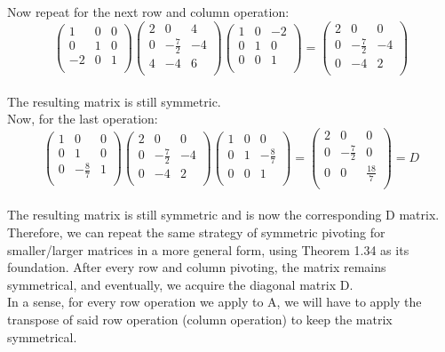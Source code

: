 \documentclass{article}
\begin{document}
Now repeat for the next row and column operation:
\[
\left(
\begin{array}{rrr}
1 & 0 & 0 \\
0 & 1 & 0 \\
-2 & 0 & 1 \\
\end{array}
\right)
\left(
\begin{array}{rrr}
2 & 0 & 4 \\
0 & -\frac{7}{2} & -4 \\
4 & -4 & 6 \\
\end{array}
\right)
\left(
\begin{array}{rrr}
1 & 0 & -2 \\
0 & 1 & 0 \\
0 & 0 & 1 \\
\end{array}
\right) = 
\left(
\begin{array}{rrr}
2 & 0 & 0 \\
0 & -\frac{7}{2} & -4 \\
0 & -4 & 2 \\
\end{array}
\right)
\]\\
The resulting matrix is still symmetric.\\

Now, for the last operation:
\[
\left(
\begin{array}{rrr}
1 & 0 & 0 \\
0 & 1 & 0 \\
0 & -\frac{8}{7} & 1 \\
\end{array}
\right)
\left(
\begin{array}{rrr}
2 & 0 & 0 \\
0 & -\frac{7}{2} & -4 \\
0 & -4 & 2 \\
\end{array}
\right)
\left(
\begin{array}{rrr}
1 & 0 & 0 \\
0 & 1 & -\frac{8}{7} \\
0 & 0 & 1 \\
\end{array}
\right) = 
\left(
\begin{array}{rrr}
2 & 0 & 0 \\
0 & -\frac{7}{2} & 0 \\
0 & 0 & \frac{18}{7} \\
\end{array}
\right) = D
\]\\
The resulting matrix is still symmetric and is now the corresponding D matrix.\\

Therefore, we can repeat the same strategy of symmetric pivoting for smaller/larger matrices in a more general form, using Theorem 1.34 as its foundation. After every row and column pivoting, the matrix remains symmetrical, and eventually, we acquire the diagonal matrix D.\\

In a sense, for every row operation we apply to A, we will have to apply the transpose of said row operation (column operation) to keep the matrix symmetrical.\\
\end{document}
